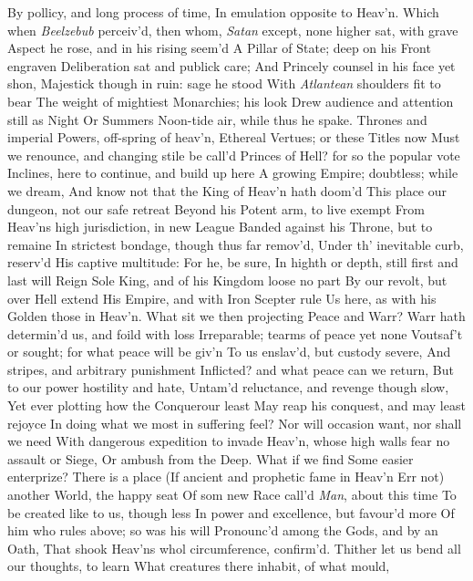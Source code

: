 \documentclass[11pt]{book}
\newcounter {first}
\newcounter {last}
\begin{document}
By pollicy, and long process of time, 
In emulation opposite to Heav'n. 
Which when \textit{Beelzebub} perceiv'd, then whom, 
\textit{Satan} except, none higher sat, with grave 
Aspect he rose, and in his rising seem'd 
A Pillar of State; deep on his Front engraven 
Deliberation sat and publick care; 
And Princely counsel in his face yet shon, 
Majestick though in ruin: sage he stood 
With \textit{Atlantean} shoulders fit to bear 
The weight of mightiest Monarchies; his look 
Drew audience and attention still as Night 
Or Summers Noon-tide air, while thus he spake. 
\quad Thrones and imperial Powers, off-spring of heav'n, 
Ethereal Vertues; or these Titles now 
Must we renounce, and changing stile be call'd 
Princes of Hell? for so the popular vote 
Inclines, here to continue, and build up here 
A growing Empire; doubtless; while we dream, 
And know not that the King of Heav'n hath doom'd 
This place our dungeon, not our safe retreat 
Beyond his Potent arm, to live exempt 
From Heav'ns high jurisdiction, in new League 
Banded against his Throne, but to remaine 
In strictest bondage, though thus far remov'd, 
Under th' inevitable curb, reserv'd 
His captive multitude: For he, be sure, 
In highth or depth, still first and last will Reign 
Sole King, and of his Kingdom loose no part 
By our revolt, but over Hell extend 
His Empire, and with Iron Scepter rule 
Us here, as with his Golden those in Heav'n. 
What sit we then projecting Peace and Warr? 
Warr hath determin'd us, and foild with loss 
Irreparable; tearms of peace yet none 
Voutsaf't or sought; for what peace will be giv'n 
To us enslav'd, but custody severe, 
And stripes, and arbitrary punishment 
Inflicted? and what peace can we return, 
But to our power hostility and hate, 
Untam'd reluctance, and revenge though slow, 
Yet ever plotting how the Conquerour least 
May reap his conquest, and may least rejoyce 
In doing what we most in suffering feel? 
Nor will occasion want, nor shall we need 
With dangerous expedition to invade 
Heav'n, whose high walls fear no assault or Siege, 
Or ambush from the Deep.  What if we find 
Some easier enterprize?  There is a place 
(If ancient and prophetic fame in Heav'n 
Err not) another World, the happy seat 
Of som new Race call'd \textit{Man}, about this time 
To be created like to us, though less 
In power and excellence, but favour'd more 
Of him who rules above; so was his will 
Pronounc'd among the Gods, and by an Oath, 
That shook Heav'ns whol circumference, confirm'd. 
Thither let us bend all our thoughts, to learn 
What creatures there inhabit, of what mould, 
\end{document}
